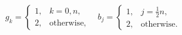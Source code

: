 \[g_{k}=\begin{cases}1,&\text{$k=0,n$},\\
2,&\text{otherwise},\end{cases}\quad b_{j}=\begin{cases}1,&\text{$j=\frac{1}{2%
}n$},\\
2,&\text{otherwise}.\end{cases}\]